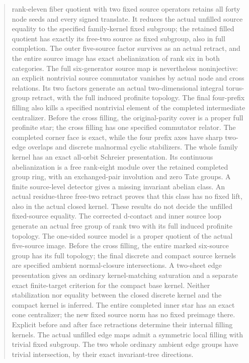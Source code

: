\documentclass[11pt,a4paper]{article}
\begin{document}
\begin{abstract}
rank-eleven fiber quotient with two fixed source operators retains all
forty node seeds and every signed translate. It reduces the actual
unfilled source equality to the specified family-kernel fixed subgroup;
the retained filled quotient has exactly its free-two source as fixed
subgroup, also in full completion. The outer five-source factor survives
as an actual retract, and the entire source image has exact abelianization
of rank six in both categories. The full six-generator source map is
nevertheless noninjective: an explicit nontrivial source commutator
vanishes by actual node and cross relations. Its two factors generate
an actual two-dimensional integral torus-group retract, with the full
induced profinite topology. The final four-prefix filling also kills a
specified nontrivial element of the completed intermediate centralizer.
Before the cross filling, the original-parity cover is a proper full
profinite star; the cross filling has one specified commutator relator.
The completed corner face is exact, while the four prefix axes have
sharp two-edge overlaps and discrete malnormal cyclic stabilizers.
The whole family kernel has an exact all-orbit Schreier presentation.
Its continuous abelianization is a free rank-eight module over the
retained completed group ring, with an exchanged-pair involution and
zero Tate groups. A finite source-level detector gives a missing
invariant abelian class. An actual residue-three free-two retract
proves that this class has no fixed lift, also in the actual closed
kernel. These results do not decide the unfilled fixed-source equality.
The corrected d-contact and inner source loop generate an actual free
group of rank two with its full induced profinite topology. The one-sided
source model is a proper quotient of the actual five-source image.
Before the cross filling, the entire marked six-source group has its
full topology; the final discrete and compact source kernels are specified
ambient normal-closure intersections. A two-sheet edge presentation gives
an ordinary kernel-matching saturation and a separate exact finite-target
criterion for the compact base kernel. Neither stabilization nor equality
between the closed discrete kernel and the compact kernel is inferred.
The entire completed inner star has an exact cone centralizer;
the new fixed source norm has no fixed preimage there. Explicit before
and after face retractions determine their internal filling kernels.
The actual unfilled edge maps admit a symmetric local filling with
trivial fixed subgroup. The two whole ordinary ambient edge groups have
trivial intersection, by their exact invariant-tree directions.

\end{abstract}
\end{document}
